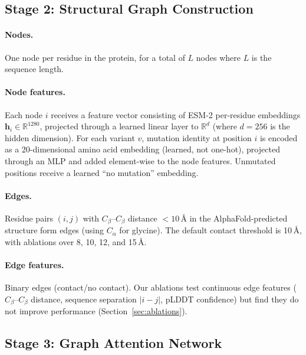 \documentclass{article}
\newcommand{\cb}{C_\beta}
\begin{document}
\subsection{Stage 2: Structural Graph Construction}

\paragraph{Nodes.} One node per residue in the protein, for a total of $L$ nodes where $L$ is the sequence length.

\paragraph{Node features.} Each node $i$ receives a feature vector consisting of ESM-2 per-residue embeddings $\mathbf{h}_i \in \mathbb{R}^{1280}$, projected through a learned linear layer to $\mathbb{R}^{d}$ (where $d = 256$ is the hidden dimension). For each variant $v$, mutation identity at position $i$ is encoded as a 20-dimensional amino acid embedding (learned, not one-hot), projected through an MLP and added element-wise to the node features. Unmutated positions receive a learned ``no mutation'' embedding.

\paragraph{Edges.} Residue pairs $(i, j)$ with $\cb$--$\cb$ distance $< 10$\,\AA{} in the AlphaFold-predicted structure form edges (using $C_\alpha$ for glycine). The default contact threshold is 10\,\AA{}, with ablations over 8, 10, 12, and 15\,\AA{}.

\paragraph{Edge features.} Binary edges (contact/no contact). Our ablations test continuous edge features ($\cb$--$\cb$ distance, sequence separation $|i-j|$, pLDDT confidence) but find they do not improve performance (Section~\ref{sec:ablations}).

\subsection{Stage 3: Graph Attention Network}
\end{document}
